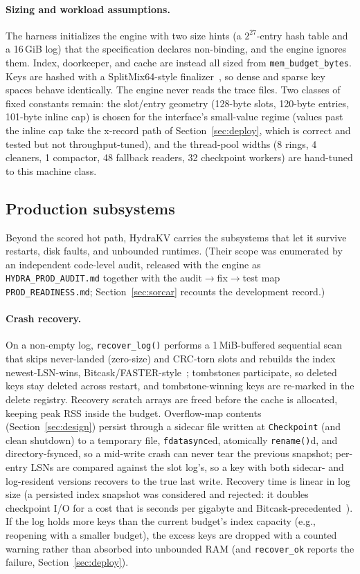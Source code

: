 \documentclass{article}
\begin{document}
\paragraph{Sizing and workload assumptions.}
The harness initializes the engine with two size hints (a $2^{27}$-entry hash table and a 16\,GiB log) that the specification declares non-binding, and the engine ignores them. Index, doorkeeper, and cache are instead all sized from \texttt{mem\_budget\_bytes}. Keys are hashed with a SplitMix64-style finalizer~\cite{splitmix}, so dense and sparse key spaces behave identically. The engine never reads the trace files. Two classes of fixed constants remain: the slot/entry geometry (128-byte slots, 120-byte entries, 101-byte inline cap) is chosen for the interface's small-value regime (values past the inline cap take the x-record path of Section~\ref{sec:deploy}, which is correct and tested but not throughput-tuned), and the thread-pool widths (8 rings, 4 cleaners, 1 compactor, 48 fallback readers, 32 checkpoint workers) are hand-tuned to this machine class.

\subsection{Production subsystems}
\label{sec:prod}

Beyond the scored hot path, HydraKV carries the subsystems that let it survive restarts, disk faults, and unbounded runtimes. (Their scope was enumerated by an independent code-level audit, released with the engine as \texttt{HYDRA\_PROD\_AUDIT.md} together with the audit$\to$fix$\to$test map \texttt{PROD\_READINESS.md}; Section~\ref{sec:sorcar} recounts the development record.)

\paragraph{Crash recovery.}
On a non-empty log, \texttt{recover\_log()} performs a 1\,MiB-buffered sequential scan that skips never-landed (zero-size) and CRC-torn slots and rebuilds the index newest-LSN-wins, Bitcask/FASTER-style~\cite{bitcask,faster}; tombstones participate, so deleted keys stay deleted across restart, and tombstone-winning keys are re-marked in the delete registry. Recovery scratch arrays are freed before the cache is allocated, keeping peak RSS inside the budget. Overflow-map contents (Section~\ref{sec:design}) persist through a sidecar file written at \texttt{Checkpoint} (and clean shutdown) to a temporary file, \texttt{fdatasync}ed, atomically \texttt{rename()}d, and directory-fsynced, so a mid-write crash can never tear the previous snapshot; per-entry LSNs are compared against the slot log's, so a key with both sidecar- and log-resident versions recovers to the true last write. Recovery time is linear in log size (a persisted index snapshot was considered and rejected: it doubles checkpoint I/O for a cost that is seconds per gigabyte and Bitcask-precedented~\cite{bitcask}). If the log holds more keys than the current budget's index capacity (e.g., reopening with a smaller budget), the excess keys are dropped with a counted warning rather than absorbed into unbounded RAM (and \texttt{recover\_ok} reports the failure, Section~\ref{sec:deploy}).
\end{document}
